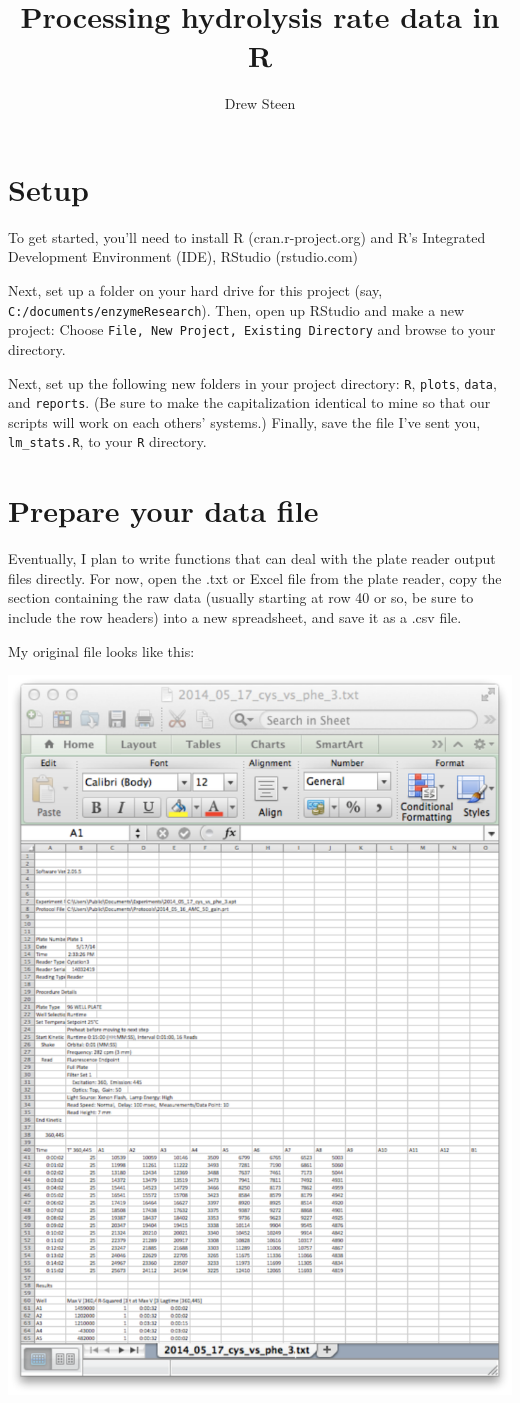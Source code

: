\documentclass{article}
\title{Processing hydrolysis rate data in R}
\author{Drew Steen}
\begin{document}
%
\maketitle

\section*{Setup}
To get started, you'll need to install R (cran.r-project.org) and R's Integrated Development Environment (IDE), RStudio (rstudio.com)

Next, set up a folder on your hard drive for this project (say, \texttt{C:/documents/enzymeResearch}). Then, open up RStudio and make a new project: Choose \texttt{File, New Project, Existing Directory} and browse to your directory. 

Next, set up the following new folders in your project directory: \texttt{R}, \texttt{plots}, \texttt{data}, and \texttt{reports}. (Be sure to make the capitalization identical to mine so that our scripts will work on each others' systems.) Finally, save the file I've sent you, \texttt{lm\_stats.R}, to your \texttt{R} directory.

\section*{Prepare your data file}
Eventually, I plan to write functions that can deal with the plate reader output files directly. For now, open the .txt or Excel file from the plate reader, copy the section containing the raw data (usually starting at row 40 or so, be sure to include the row headers) into a new spreadsheet, and save it as a .csv file.

My original file looks like this:

\includegraphics{raw_output.pdf}
\end{document}
